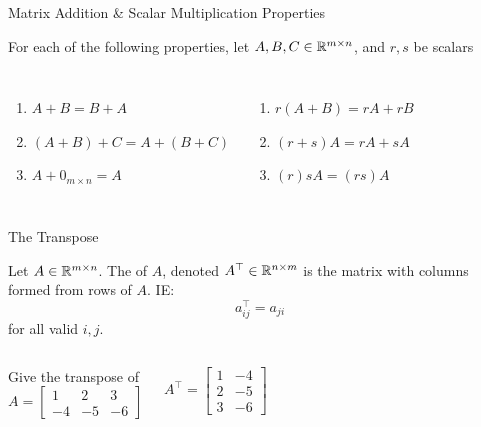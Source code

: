 \documentclass[xcoler=dvipsnames, aspectratio=169]{beamer}
\begin{document}
    \begin{frame}{Matrix Addition \& Scalar Multiplication Properties}
        \begin{tcolorbox}
            For each of the following properties, let $A,B,C\in\mathbb{R}^{m\times n}$, and $r,s$ be 
            scalars
            \begin{columns}
                \begin{enumerate}
                    \item $A+B = B+A$ \pause
                    \item $(A+B) + C = A + (B+C)$ \pause
                    \item $A + 0_{m\times n} = A$\pause
                \end{enumerate}
                \begin{enumerate}
                    \addtocounter{enumi}{3}
                    \item $r(A+B) = rA + rB$ \pause
                    \item $(r+s)A = rA + sA$ \pause
                    \item $(r)sA = (rs)A$
                \end{enumerate}
            \end{columns}
        \end{tcolorbox}
    \end{frame}
    \begin{frame}{The Transpose}
        \begin{defn}
            Let $A\in\mathbb{R}^{m\times n}$. The  of $A$, denoted $A^\top\in\mathbb{R}^{n\times m}$
            is the matrix with columns formed from rows of $A$. IE:
            \[
                a^\top_{ij} = a_{ji}
            \]
            for all valid $i,j$.
        \end{defn}\pause
        \begin{columns}
            \begin{example}
                Give the transpose of
                \[
                    A = \begin{bmatrix}
                        1 & 2 & 3\\
                        -4&-5 &-6
                    \end{bmatrix}
                \]
            \end{example}\pause
                \[
                    A^\top = \begin{bmatrix}
                        1 & -4\\
                        2 & -5\\
                        3 & -6
                    \end{bmatrix}
                \]
        \end{columns}
    \end{frame}
\end{document}
